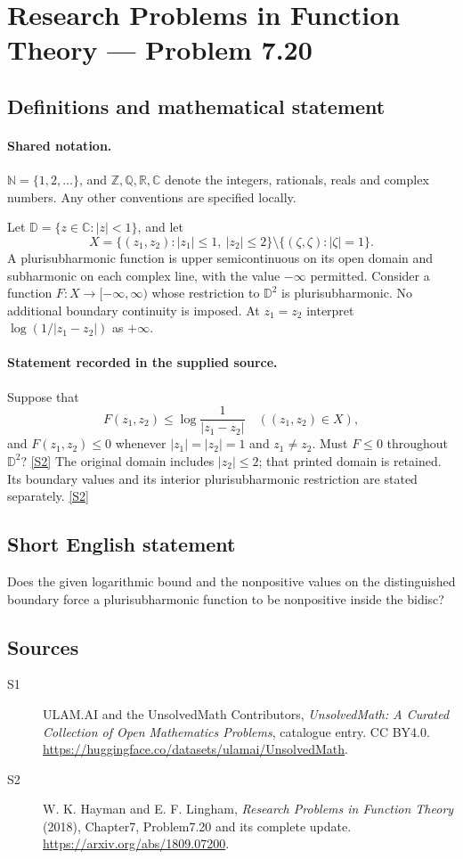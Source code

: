 \documentclass[11pt]{article}
\newcommand{\sref}[2]{\hyperlink{source:#1:#2}{[S#2]}}
\begin{document}
\section{Research Problems in Function Theory — Problem 7.20}\label{statement}

\subsection{Definitions and mathematical statement}

\paragraph{Shared notation.}$\mathbb N=\{1,2,\ldots\}$, and $\mathbb Z,\mathbb Q,\mathbb R,\mathbb C$ denote the integers, rationals, reals and complex numbers. Any other conventions are specified locally.


Let $\mathbb D=\{z\in\mathbb C:|z|<1\}$, and let
\[X=\{(z_1,z_2):|z_1|\le1,\ |z_2|\le2\}\setminus\{(\zeta,\zeta):|\zeta|=1\}.
\]
A plurisubharmonic function is upper semicontinuous on its open domain and subharmonic on each complex line, with the value $-\infty$ permitted. Consider a function $F:X\to[-\infty,\infty)$ whose restriction to $\mathbb D^2$ is plurisubharmonic. No additional boundary continuity is imposed. At $z_1=z_2$ interpret $\log(1/|z_1-z_2|)$ as $+\infty$.

\paragraph{Statement recorded in the supplied source.}
Suppose that
\[F(z_1,z_2)\le\log\frac1{|z_1-z_2|}\quad((z_1,z_2)\in X),\]
and $F(z_1,z_2)\le0$ whenever $|z_1|=|z_2|=1$ and $z_1\ne z_2$. Must $F\le0$ throughout $\mathbb D^2$? \sref{statement}{2}
The original domain includes $|z_2|\le2$; that printed domain is retained. Its boundary values and its interior plurisubharmonic restriction are stated separately. \sref{statement}{2}
\subsection{Short English statement}
Does the given logarithmic bound and the nonpositive values on the distinguished boundary force a plurisubharmonic function to be nonpositive inside the bidisc?
\subsection{Sources}
\begin{description}
\item[\hypertarget{source:statement:1}{S1}] ULAM.AI and the UnsolvedMath Contributors, \emph{UnsolvedMath: A Curated Collection of Open Mathematics Problems}, catalogue entry. CC BY4.0. \url{https://huggingface.co/datasets/ulamai/UnsolvedMath}.
\item[\hypertarget{source:statement:2}{S2}] W. K. Hayman and E. F. Lingham, \emph{Research Problems in Function Theory} (2018), Chapter7, Problem7.20 and its complete update. \url{https://arxiv.org/abs/1809.07200}.
\end{description}
\label{end:statement}
\end{document}

